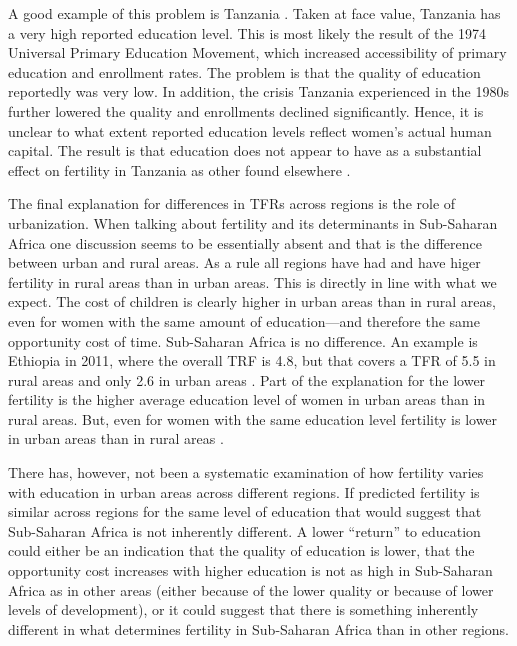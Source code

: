 \documentclass[letterpaper,12pt]{article}
\begin{document}
A good example of this problem is Tanzania \citep{Galabawa2001,Wedgwood2005}.
Taken at face value, Tanzania has a very high reported education level.
This is most likely the result of the 1974 Universal Primary Education 
Movement, which increased accessibility of primary education and 
enrollment rates.
The problem is that the quality of education reportedly was very low. 
In addition, the crisis Tanzania experienced in the 1980s further 
lowered the quality and enrollments declined significantly. 
Hence, it is unclear to what extent reported education levels 
reflect women's actual human capital.
The result is that education does not appear to have as a substantial
effect on fertility in Tanzania as other found elsewhere \citet{Alam2016}.


The final explanation for differences in TFRs across
regions is the role of urbanization.
When talking about fertility and its determinants in
Sub-Saharan Africa one discussion seems to be essentially
absent and that is the difference between urban and rural areas.
As a rule all regions have had and have higer fertility in
rural areas than in urban areas.
This is directly in line with what we expect.
The cost of children is clearly higher in urban areas than
in rural areas, even for women with the same amount of education---and
therefore the same opportunity cost of time.
Sub-Saharan Africa is no difference.
An example is Ethiopia in 2011, where the overall TRF is 4.8, but 
that covers a TFR of 5.5 in rural areas and only 2.6 in urban 
areas \citep{Central-Statistical-Agency/Ethiopia2012}.
Part of the explanation for the lower fertility is the
higher average education level of women in urban areas
than in rural areas.
But, even for women with the same education level fertility
is lower in urban areas than in rural areas \citep{Ainsworth1996}.

There has, however, not been a systematic examination of
how fertility varies with education in urban areas across
different regions.
If predicted fertility is similar across regions for the
same level of education that would suggest that Sub-Saharan Africa
is not inherently different.
A lower ``return'' to education could either be an indication
that the quality of education is lower, that the opportunity
cost increases with higher education is not as high in
Sub-Saharan Africa as in other areas (either because of
the lower quality or because of lower levels of development),
or it could suggest that there is something inherently
different in what determines fertility in Sub-Saharan Africa
than in other regions.
\end{document}
